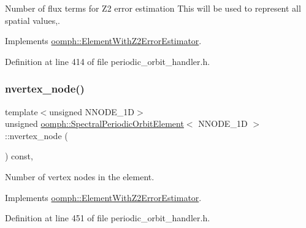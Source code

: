 Number of flux terms for Z2 error estimation This will be used to represent all spatial values,. 



Implements \hyperlink{classoomph_1_1ElementWithZ2ErrorEstimator_ae82c5728902e13da31be19c390fc28e3}{oomph\+::\+Element\+With\+Z2\+Error\+Estimator}.



Definition at line 414 of file periodic\+\_\+orbit\+\_\+handler.\+h.

\mbox{\label{classoomph_1_1SpectralPeriodicOrbitElement_a3ec38d16dfb22d1e7090b230db3479d5}} 
\subsubsection{\texorpdfstring{nvertex\+\_\+node()}{nvertex\_node()}}
{\footnotesize\ttfamily template$<$unsigned N\+N\+O\+D\+E\+\_\+1D$>$ \\
unsigned \hyperlink{classoomph_1_1SpectralPeriodicOrbitElement}{oomph\+::\+Spectral\+Periodic\+Orbit\+Element}$<$ N\+N\+O\+D\+E\+\_\+1D $>$\+::nvertex\+\_\+node (\begin{DoxyParamCaption}{ }\end{DoxyParamCaption}) const\hspace{0.3cm}{\ttfamily [inline]}, {\ttfamily [virtual]}}



Number of vertex nodes in the element. 



Implements \hyperlink{classoomph_1_1ElementWithZ2ErrorEstimator_a19495a0e77ef4ff35f15fdf7913b4077}{oomph\+::\+Element\+With\+Z2\+Error\+Estimator}.



Definition at line 451 of file periodic\+\_\+orbit\+\_\+handler.\+h.

\mbox{\label{classoomph_1_1SpectralPeriodicOrbitElement_ac2b85b567337f5126c4dea2e8c82ed17}} 
